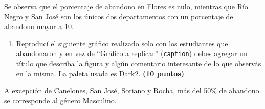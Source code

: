 \documentclass[
]{article}
\newenvironment{Shaded}{\begin{snugshade}}{\end{snugshade}}
\newcommand{\DataTypeTok}[1]{\textcolor[rgb]{0.13,0.29,0.53}{#1}}
\newcommand{\DecValTok}[1]{\textcolor[rgb]{0.00,0.00,0.81}{#1}}
\newcommand{\KeywordTok}[1]{\textcolor[rgb]{0.13,0.29,0.53}{\textbf{#1}}}
\newcommand{\NormalTok}[1]{#1}
\newcommand{\OperatorTok}[1]{\textcolor[rgb]{0.81,0.36,0.00}{\textbf{#1}}}
\newcommand{\StringTok}[1]{\textcolor[rgb]{0.31,0.60,0.02}{#1}}
\providecommand{\tightlist}{%
  \setlength{\itemsep}{0pt}\setlength{\parskip}{0pt}}
\begin{document}
Se observa que el porcentaje de abandono en Flores es nulo, mientras que
Río Negro y San José son los únicos dos departamentos con un porcentaje
de abandono mayor a 10.

\begin{enumerate}
\def\labelenumi{\arabic{enumi}.}
\setcounter{enumi}{4}
\tightlist
\item
  Reproducí el siguiente gráfico realizado solo con los estudiantes que
  abandonaron y en vez de ``Gráfico a replicar'' (\texttt{caption})
  debes agregar un título que describa la figura y algún comentario
  interesante de lo que observás en la misma. La paleta usada es Dark2.
  \textbf{(10 puntos)}
\end{enumerate}

\begin{Shaded}
\end{Shaded}

A excepción de Canelones, San José, Soriano y Rocha, más del 50\% de
abandono se corresponde al género Masculino.
\end{document}

